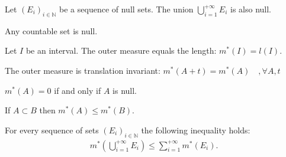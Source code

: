         \begin{theorem}
		Let $(E_i)_{i\in\mathbb{N}}$ be a sequence of null sets. The union $\bigcup_{i=1}^{+\infty}E_i$ is also null.
	\end{theorem}
        \begin{result}\label{lebesgue:theorem:countable_set_is_null}
        	Any countable set is null.
        \end{result}
    
        
        \begin{property}
		Let $I$ be an interval. The outer measure equals the length: $m^*(I) = l(I)$.
	\end{property}
        \begin{property}
		The outer measure is translation invariant: $m^*(A + t) = m^*(A)\quad,\forall A,t$
	\end{property}
        \begin{property}
		$m^*(A) = 0$ if and only if $A$ is null.
	\end{property}
        \begin{property}
		If $A\subset B$ then $m^*(A)\leq m^*(B)$.
	\end{property}
        \begin{property}
        	For every sequence of sets $(E_i)_{i\in\mathbb{N}}$ the following inequality holds: 
		\begin{gather}
			m^*\left(\bigcup_{i=1}^{+\infty}E_i\right) \leq \sum_{i=1}^{+\infty}m^*(E_i).
		\end{gather}
	\end{property}
        
